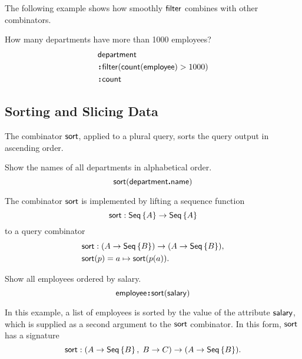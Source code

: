 The following example shows how smoothly $\textup{\textsf{filter}}$ combines with other
combinators.

\begin{example}
    \label{ex:filter-by-size-and-count}
    How many departments have more than 1000 employees?
    \begin{align*}
        & \textup{\textsf{department}} \\
        & \!\boldsymbol{:}\!\textup{\textsf{filter}}(\textup{\textsf{count}}(\textup{\textsf{employee}})>1000) \\
        & \!\boldsymbol{:}\!\textup{\textsf{count}}
    \end{align*}
\end{example}

\subsection*{Sorting and Slicing Data}

The combinator $\textup{\textsf{sort}}$, applied to a plural query, sorts the query output in
ascending order.

\begin{example}
    \label{ex:sort-department-name}
    Show the names of all departments in alphabetical order.
    \begin{equation*}
        \textup{\textsf{sort}}(\textup{\textsf{department}}\boldsymbol{.}\textup{\textsf{name}})
    \end{equation*}
\end{example}

The combinator $\textup{\textsf{sort}}$ is implemented by lifting a sequence function
\begin{equation*}
    \textup{\textsf{sort}} : \textup{\textsf{Seq}}\left\{A\right\} \to \textup{\textsf{Seq}}\left\{A\right\}
\end{equation*}
to a query combinator
\begin{align*}
    & \textup{\textsf{sort}} : (A \to \textup{\textsf{Seq}}\left\{B\right\}) \to (A \to \textup{\textsf{Seq}}\left\{B\right\}), \\
    & \textup{\textsf{sort}}(p) = a \mapsto \textup{\textsf{sort}}(p(a)).
\end{align*}

\begin{example}
    \label{ex:sort-employee-by-salary}
    Show all employees ordered by salary.
    \begin{equation*}
        \textup{\textsf{employee}}\!\boldsymbol{:}\!\textup{\textsf{sort}}(\textup{\textsf{salary}})
    \end{equation*}
\end{example}

In this example, a list of employees is sorted by the value of the attribute
$\textup{\textsf{salary}}$, which is supplied as a second argument to the $\textup{\textsf{sort}}$ combinator.
In this form, $\textup{\textsf{sort}}$ has a signature
\begin{equation*}
    \textup{\textsf{sort}} : (A \to \textup{\textsf{Seq}}\left\{B\right\},\; B \to C) \to (A \to \textup{\textsf{Seq}}\left\{B\right\}).
\end{equation*}

